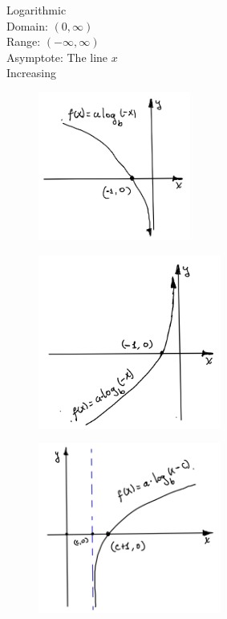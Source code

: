 \begin{multicols}{2}
\begin{center}
        Logarithmic\\
        Domain: $(0, \infty)$\\
        Range: $(-\infty, \infty)$\\
        Asymptote: The line $x$ \\
        Increasing
        \vspace{8mm}
    \end{center}
    \hline
    \begin{figure}[H]
        \centering
        \includegraphics[width=5cm]{images/fig9}
    \end{figure}
    \begin{figure}[H]
        \centering
        \includegraphics[width=6cm]{images/fig10}
    \end{figure}
    \begin{figure}[H]
        \centering
        \includegraphics[width=6cm]{images/fig11}
    \end{figure}

\end{multicols}
